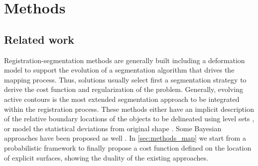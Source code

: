 %
%
%
%


\section*{Methods}
\label{sec:methods}
%
\subsection*{Related work}
\label{sec:methods_background}
Registration-segmentation methods are generally built including a deformation model to
  support the evolution of a segmentation algorithm that drives the mapping process.
Thus, solutions usually select first a segmentation strategy to derive the cost function and
  regularization of the problem.
Generally, evolving active contours is the most extended segmentation approach to be
  integrated within the registration process.
These methods either have an implicit description of the relative boundary locations of the
  objects to be delineated using level sets \citep{chen_using_2002,bresson_variational_2006,
  chan_level_2005}, or model the statistical deviations from original shape
  \citep{cremers_kernel_2006,gastaud_combining_2004}.
Some Bayesian approaches have been proposed as well
  \citep{wyatt_map_2003,pohl_bayesian_2006,gass_simultaneous_2014}.
In \autoref{sec:methods_map} we start from a probabilistic framework to finally propose
	a cost function defined on the location of explicit surfaces, showing the duality of the
	existing approaches.

